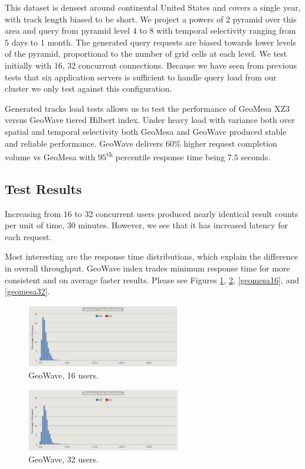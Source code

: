 This dataset is densest around continental United States and covers a single year, with track length biased to be short.
We project a powers of $2$ pyramid over this area and query from pyramid level $4$ to $8$ with temporal selectivity ranging from $5$ days to $1$ month.
The generated query requests are biased towards lower levels of the pyramid, proportional to the number of grid cells at each level.
We test initially with $16$, $32$ concurrent connections.
Because we have seen from previous tests that six application servers is sufficient to handle query load from our cluster we only test against this configuration.

Generated tracks load tests allows us to test the performance of GeoMesa XZ3 versus GeoWave tiered Hilbert index.
Under heavy load with variance both over spatial and temporal selectivity both GeoMesa and GeoWave produced stable and reliable performance.
GeoWave delivers $60$\% higher request completion volume vs GeoMesa with $95$\textsuperscript{th} percentile response time being $7.5$ seconds.

\subsection{Test Results}

Increasing from $16$ to $32$ concurrent users produced nearly identical result counts per unit of time, $30$ minutes.
However, we see that it has increased latency for each request.

Most interesting are the response time distributions, which explain the difference in overall throughput.
GeoWave index trades minimum response time for more consistent and on average faster results.
Please see Figures \ref{geowave16}, \ref{geowave32}, \ref{geomesa16}, and \ref{geomesa32}.

\begin{figure}[h!tb]
  \centering
  \includegraphics[width=0.60\textwidth]{../docs/img/multitenancy/gw-16-responses.png}
  \caption{GeoWave, 16 users.}
  \label{geowave16}
\end{figure}

\begin{figure}[h!tb]
  \centering
  \includegraphics[width=0.60\textwidth]{../docs/img/multitenancy/gw-32-responses.png}
  \caption{GeoWave, 32 users.}
  \label{geowave32}
\end{figure}

